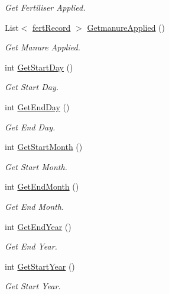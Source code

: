 \begin{DoxyCompactItemize}
\begin{DoxyCompactList}\small\item\em Get Fertiliser Applied. \end{DoxyCompactList}\item 
List$<$ \mbox{\hyperlink{classfert_record}{fert\+Record}} $>$ \mbox{\hyperlink{class_crop_class_af9ecdb2d77c3a4fd83adf11943080076}{Getmanure\+Applied}} ()
\begin{DoxyCompactList}\small\item\em Get Manure Applied. \end{DoxyCompactList}\item 
int \mbox{\hyperlink{class_crop_class_a7c4d2bbbac6e3080761d78f36529165f}{Get\+Start\+Day}} ()
\begin{DoxyCompactList}\small\item\em Get Start Day. \end{DoxyCompactList}\item 
int \mbox{\hyperlink{class_crop_class_afd83e45f266ef122520eda982353851c}{Get\+End\+Day}} ()
\begin{DoxyCompactList}\small\item\em Get End Day. \end{DoxyCompactList}\item 
int \mbox{\hyperlink{class_crop_class_a7ff852ec08ae48a2171af4b77b936acf}{Get\+Start\+Month}} ()
\begin{DoxyCompactList}\small\item\em Get Start Month. \end{DoxyCompactList}\item 
int \mbox{\hyperlink{class_crop_class_a243b6f49a2b3b5214282130e06907f3c}{Get\+End\+Month}} ()
\begin{DoxyCompactList}\small\item\em Get End Month. \end{DoxyCompactList}\item 
int \mbox{\hyperlink{class_crop_class_a580b5cfd5209f277d28159a7147084c1}{Get\+End\+Year}} ()
\begin{DoxyCompactList}\small\item\em Get End Year. \end{DoxyCompactList}\item 
int \mbox{\hyperlink{class_crop_class_a69c565cddd3267be4e9bf51cb3581961}{Get\+Start\+Year}} ()
\begin{DoxyCompactList}\small\item\em Get Start Year. \end{DoxyCompactList}\item 

\end{DoxyCompactItemize}

